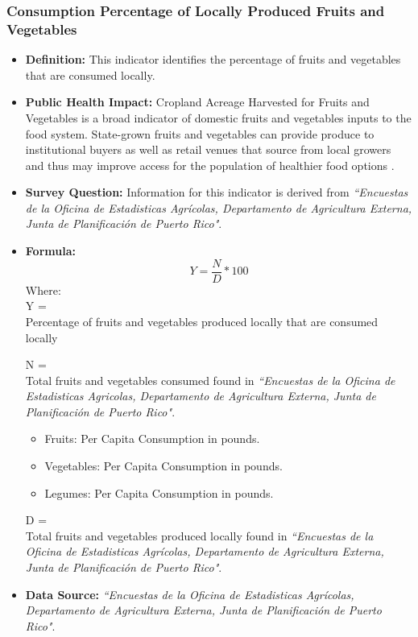 \documentclass[12pt,letterpaper]{report}
\begin{document}
\subsubsection{Consumption Percentage of Locally Produced Fruits and Vegetables} 
	\begin{itemize}
		\item \textbf{Definition:} This indicator identifies the percentage of fruits and vegetables that are consumed locally.

		\item \textbf{Public Health Impact:} Cropland Acreage Harvested for Fruits and Vegetables is a broad indicator of domestic fruits and vegetables inputs to the food system. State-grown fruits and vegetables can provide produce to institutional buyers as well as retail venues that source from local growers and thus may improve access for the population of healthier food options \cite{sobal1998conceptual}.
		\item \textbf{Survey Question:}
		Information for this indicator is derived from \textit{``Encuestas de la Oficina de Estadisticas Agr\'icolas, Departamento de Agricultura Externa, Junta de Planificaci\'on de Puerto Rico"}.
		\item \textbf{Formula:} 
			\begin{equation}
				Y = \frac{N}{D} *100
			\end{equation}
Where: \\
			Y = \\ Percentage of fruits and vegetables produced locally that are consumed locally
			
			N = \\ Total fruits and vegetables consumed found in \textit{``Encuestas de la Oficina de Estadisticas Agricolas, Departamento de Agricultura Externa, Junta de Planificaci\'on de Puerto Rico"}.
			
\begin{itemize}
\item{Fruits:} Per Capita Consumption in pounds.
\item{Vegetables:} Per Capita Consumption in pounds.
\item{Legumes:} Per Capita Consumption in pounds.
\end{itemize}
			
			D = \\ Total fruits and vegetables produced locally found in \textit{``Encuestas de la Oficina de Estadisticas Agr\'icolas, Departamento de Agricultura Externa, Junta de Planificaci\'on de Puerto Rico"}.
			
		\item \textbf{Data Source:} \textit{``Encuestas de la Oficina de Estadisticas Agr\'icolas, Departamento de Agricultura Externa, Junta de Planificaci\'on de Puerto Rico"}.
	\end{itemize}
\end{document}
